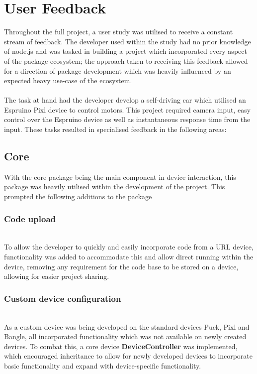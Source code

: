 \documentclass{l4proj}
\begin{document}
\section{User Feedback}
Throughout the full project, a user study was utilised to receive a constant stream of feedback. The developer used within the study had no prior knowledge of node.js and was tasked in building a project which incorporated every aspect of the package ecosystem; the approach taken to receiving this feedback allowed for a direction of package development which was heavily influenced by an expected heavy use-case of the ecosystem.
\\ \\
The task at hand had the developer develop a self-driving car which utilised an Espruino Pixl device to control motors. This project required camera input, easy control over the Espruino device as well as instantaneous response time from the input. These tasks resulted in specialised feedback in the following areas:

\subsection{Core}
With the core package being the main component in device interaction, this package was heavily utilised within the development of the project. This prompted the following additions to the package

\subsubsection{Code upload}\hfill\\
To allow the developer to quickly and easily incorporate code from a URL device, functionality was added to accommodate this and allow direct running within the device, removing any requirement for the code base to be stored on a device, allowing for easier project sharing.
\subsubsection{Custom device configuration}\hfill\\
As a custom device was being developed on the standard devices Puck, Pixl and Bangle, all incorporated functionality which was not available on newly created devices. To combat this, a core device \textbf{DeviceController} was implemented, which encouraged inheritance to allow for newly developed devices to incorporate basic functionality and expand with device-specific functionality.
\end{document}
